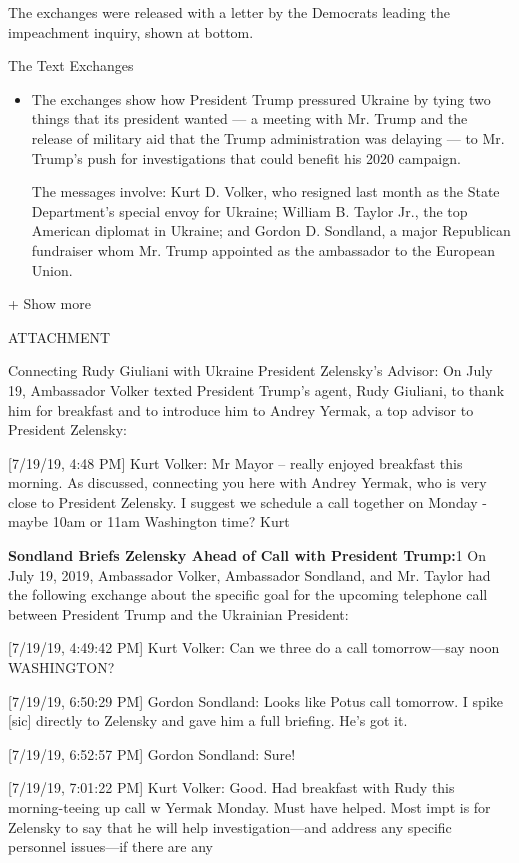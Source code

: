 The exchanges were released with a letter by the Democrats leading the
impeachment inquiry, shown at bottom.

The Text Exchanges

\begin{itemize}
\item
  The exchanges show how President Trump pressured Ukraine by tying two
  things that its president wanted --- a meeting with Mr. Trump and the
  release of military aid that the Trump administration was delaying ---
  to Mr. Trump's push for investigations that could benefit his 2020
  campaign.

  The messages involve: Kurt D. Volker, who resigned last month as the
  State Department's special envoy for Ukraine; William B. Taylor Jr.,
  the top American diplomat in Ukraine; and Gordon D. Sondland, a major
  Republican fundraiser whom Mr. Trump appointed as the ambassador to
  the European Union.
\end{itemize}

+ Show more

ATTACHMENT

Connecting Rudy Giuliani with Ukraine President Zelensky's Advisor: On
July 19, Ambassador Volker texted President Trump's agent, Rudy
Giuliani, to thank him for breakfast and to introduce him to Andrey
Yermak, a top advisor to President Zelensky:

{[}7/19/19, 4:48 PM{]} Kurt Volker: Mr Mayor -- really enjoyed breakfast
this morning. As discussed, connecting you here with Andrey Yermak, who
is very close to President Zelensky. I suggest we schedule a call
together on Monday - maybe 10am or 11am Washington time? Kurt

\textbf{Sondland Briefs Zelensky Ahead of Call with President Trump:}1
On July 19, 2019, Ambassador Volker, Ambassador Sondland, and Mr. Taylor
had the following exchange about the specific goal for the upcoming
telephone call between President Trump and the Ukrainian President:

{[}7/19/19, 4:49:42 PM{]} Kurt Volker: Can we three do a call
tomorrow---say noon WASHINGTON?

{[}7/19/19, 6:50:29 PM{]} Gordon Sondland: Looks like Potus call
tomorrow. I spike {[}sic{]} directly to Zelensky and gave him a full
briefing. He's got it.

{[}7/19/19, 6:52:57 PM{]} Gordon Sondland: Sure!

{[}7/19/19, 7:01:22 PM{]} Kurt Volker: Good. Had breakfast with Rudy
this morning-teeing up call w Yermak Monday. Must have helped. Most impt
is for Zelensky to say that he will help investigation---and address any
specific personnel issues---if there are any

